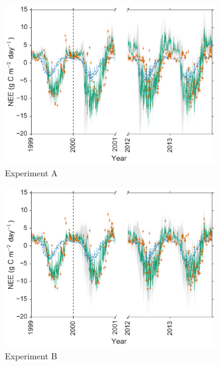\begin{figure}
    \centering
    \begin{subfigure}[b]{0.49\textwidth}
        \includegraphics[width=\textwidth]{chapter/chapter6/Abroke4dvar2.pdf}
        \caption{Experiment A}
        \label{chap6:fig:broke4dvardiagBR}
    \end{subfigure}
    \begin{subfigure}[b]{0.49\textwidth}
        \includegraphics[width=\textwidth]{chapter/chapter6/Bbroke4dvar2.pdf}
        \caption{Experiment B}
        \label{chap6:fig:broke4dvaredcBR}
    \end{subfigure}
    \begin{subfigure}[b]{0.49\textwidth}

\end{subfigure}
\end{figure}
